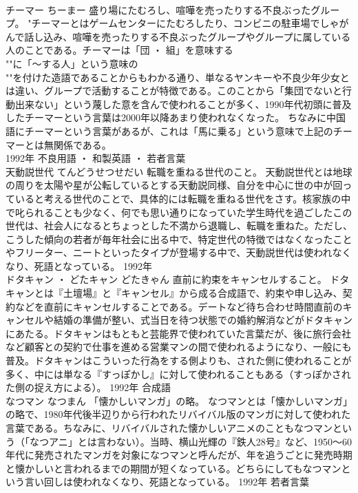 \documentclass[8pt]{extreport}
\begin{document}
\begin{CJK}{UTF8}{min}
\\	チーマー	ちーまー	盛り場にたむろし、喧嘩を売ったりする不良ぶったグループ。	"チーマーとはゲームセンターにたむろしたり、コンビニの駐車場でしゃがんで話し込み、喧嘩を売ったりする不良ぶったグループやグループに属している人のことである。チーマーは「団 ・ 組」を意味する
\\	""に「～する人」という意味の
\\	""を付けた造語であることからもわかる通り、単なるヤンキーや不良少年少女とは違い、グループで活動することが特徴である。このことから「集団でないと行動出来ない」という蔑した意を含んで使われることが多く、1990年代初頭に普及したチーマーという言葉は2000年以降あまり使われなくなった。 ちなみに中国語にチーマーという言葉があるが、これは「馬に乗る」という意味で上記のチーマーとは無関係である。
\\	1992年	不良用語 ・ 和製英語 ・ 若者言葉	
\\	天動説世代	てんどうせつせだい	転職を重ねる世代のこと。	天動説世代とは地球の周りを太陽や星が公転しているとする天動説同様、自分を中心に世の中が回っていると考える世代のことで、具体的には転職を重ねる世代をさす。核家族の中で叱られることも少なく、何でも思い通りになっていた学生時代を過ごしたこの世代は、社会人になるとちょっとした不満から退職し、転職を重ねた。ただし、こうした傾向の若者が毎年社会に出る中で、特定世代の特徴ではなくなったことやフリーター、ニートといったタイプが登場する中で、天動説世代は使われなくなり、死語となっている。	1992年	
\\	ドタキャン ・ どたキャン	どたきゃん	直前に約束をキャンセルすること。	ドタキャンとは『土壇場』と『キャンセル』から成る合成語で、約束や申し込み、契約などを直前にキャンセルすることである。デートなど待ち合わせ時間直前のキャンセルや結婚の準備が整い、式当日を待つ状態での婚約解消などがドタキャンにあたる。ドタキャンはもともと芸能界で使われていた言葉だが、後に旅行会社など顧客との契約で仕事を進める営業マンの間で使われるようになり、一般にも普及。ドタキャンはこういった行為をする側よりも、された側に使われることが多く、中には単なる『すっぽかし』に対して使われることもある（すっぽかされた側の捉え方による）。	1992年	合成語	
\\	なつマン	なつまん	「懐かしいマンガ」の略。	なつマンとは「懐かしいマンガ」の略で、1980年代後半辺りから行われたリバイバル版のマンガに対して使われた言葉である。ちなみに、リバイバルされた懐かしいアニメのこともなつマンという（「なつアニ」とは言わない）。当時、横山光輝の『鉄人28号』など、1950～60年代に発売されたマンガを対象になつマンと呼んだが、年を追うごとに発売時期と懐かしいと言われるまでの期間が短くなっている。どちらにしてもなつマンという言い回しは使われなくなり、死語となっている。	1992年	若者言葉	

\end{CJK}
\end{document}
